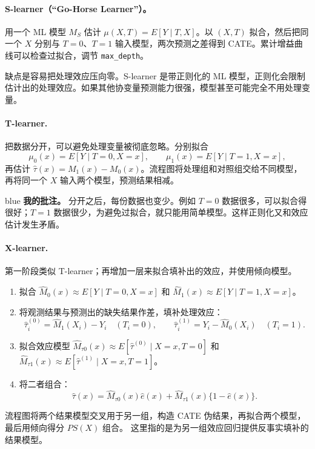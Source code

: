 {\paragraph{S-learner（“Go-Horse Learner”）。}
用一个 ML 模型 $M_S$ 估计 $\mu(X,T)=E[Y\mid T,X]$。以 $(X,T)$ 拟合，然后把同一个 $X$ 分别与 $T=0$、$T=1$ 输入模型，两次预测之差得到 CATE。累计增益曲线可以检查过拟合，调节 \texttt{max\_depth}。

缺点是容易把处理效应压向零。S-learner 是带正则化的 ML 模型，正则化会限制估计出的处理效应。如果其他协变量预测能力很强，模型甚至可能完全不用处理变量。

\paragraph{T-learner.}
把数据分开，可以避免处理变量被彻底忽略。分别拟合
\[\mu_0(x)=E[Y\mid T=0,X=x],\qquad \mu_1(x)=E[Y\mid T=1,X=x],\]
再估计 $\hat\tau(x)=M_1(x)-M_0(x)$。流程图将处理组和对照组交给不同模型，再将同一个 $X$ 输入两个模型，预测结果相减。

\begin{inkblock}{blue}
\textbf{我的批注。} 分开之后，每份数据也变少。例如 $T=0$ 数据很多，可以拟合得很好；$T=1$ 数据很少，为避免过拟合，就只能用简单模型。这样正则化又和效应估计发生矛盾。
\end{inkblock}

\paragraph{X-learner.}
第一阶段类似 T-learner；再增加一层来拟合填补出的效应，并使用倾向模型。
\begin{enumerate}
\item 拟合 $\hat M_0(x)\approx E[Y\mid T=0,X=x]$ 和 $\hat M_1(x)\approx E[Y\mid T=1,X=x]$。
\item 将观测结果与预测出的缺失结果作差，填补处理效应：
\[\hat\tau_i^{(0)}=\hat M_1(X_i)-Y_i\quad(T_i=0),\qquad
\hat\tau_i^{(1)}=Y_i-\hat M_0(X_i)\quad(T_i=1).
\]
\item 拟合效应模型 $\hat M_{\tau0}(x)\approx E[\hat\tau^{(0)}\mid X=x,T=0]$ 和 $\hat M_{\tau1}(x)\approx E[\hat\tau^{(1)}\mid X=x,T=1]$。
\item 将二者组合：
\[\hat\tau(x)=\hat M_{\tau0}(x)\hat e(x)+\hat M_{\tau1}(x)\{1-\hat e(x)\}.\]
\end{enumerate}
流程图将两个结果模型交叉用于另一组，构造 CATE 伪结果，再拟合两个模型，最后用倾向得分 $PS(X)$ 组合。 这里指的是为另一组效应回归提供反事实填补的结果模型。

}
